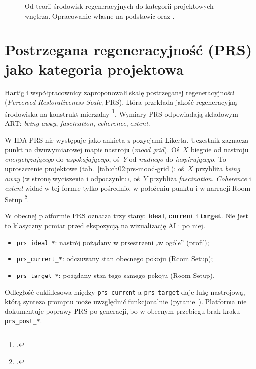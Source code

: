 \begin{figure}[htbp]
  \centering
  \caption{Od teorii środowisk regeneracyjnych do kategorii projektowych wnętrza.
    Opracowanie własne na podstawie \textcite{kaplan1995restorative} oraz \textcite{ulrich1984window}.}
  \label{fig:ch02:restorative-framework}
\end{figure}

\section{Postrzegana regeneracyjność (PRS) jako kategoria projektowa}
\label{ch02:sec:prs}

Hartig i współpracownicy zaproponowali skalę postrzeganej regeneracyjności (\emph{Perceived Restorativeness Scale}, PRS), która przekłada jakość regeneracyjną środowiska na konstrukt mierzalny \footcite{hartig1997prs}.
Wymiary PRS odpowiadają składowym ART: \emph{being away}, \emph{fascination}, \emph{coherence}, \emph{extent}.

W IDA PRS nie występuje jako ankieta z pozycjami Likerta. Uczestnik zaznacza punkt na dwuwymiarowej mapie nastroju (\emph{mood grid}).
Oś~$X$ biegnie od nastroju \emph{energetyzującego} do \emph{uspokajającego}, oś~$Y$ od \emph{nudnego} do \emph{inspirującego}.
To uproszczenie projektowe (tab.~\ref{tab:ch02:prs-mood-grid}): oś~$X$ przybliża \emph{being away} (w stronę wyciszenia i odpoczynku), oś~$Y$ przybliża \emph{fascination}. \emph{Coherence} i \emph{extent} widać w tej formie tylko pośrednio, w położeniu punktu i w narracji Room Setup \footcite{idaPlatform2026}.

W obecnej platformie PRS oznacza trzy stany: \textbf{ideal}, \textbf{current} i \textbf{target}. Nie jest to klasyczny pomiar przed ekspozycją na wizualizację AI i po niej.
\begin{itemize}
  \item \texttt{prs\_ideal\_*}: nastrój pożądany w przestrzeni „w ogóle” (profil);
  \item \texttt{prs\_current\_*}: odczuwany stan obecnego pokoju (Room Setup);
  \item \texttt{prs\_target\_*}: pożądany stan tego samego pokoju (Room Setup).
\end{itemize}
Odległość euklidesowa między \texttt{prs\_current} a \texttt{prs\_target} daje lukę nastrojową, którą synteza promptu może uwzględnić funkcjonalnie (pytanie~).
Platforma nie dokumentuje poprawy PRS po generacji, bo w obecnym przebiegu brak kroku \texttt{prs\_post\_*}.

